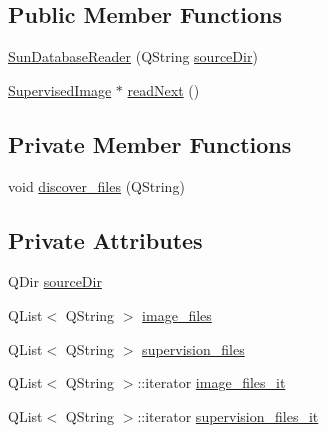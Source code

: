 \subsection*{Public Member Functions}
\begin{DoxyCompactItemize}
\item 
\hyperlink{class_sun_database_reader_a7165e085898b5e329402b8acc17f3e0e}{Sun\+Database\+Reader} (Q\+String \hyperlink{class_sun_database_reader_a6bfc31b2ba24be2b3e18c32e0d343d70}{source\+Dir})
\item 
\hyperlink{class_supervised_image}{Supervised\+Image} $\ast$ \hyperlink{class_sun_database_reader_aadf059f614225be059e05a7c3a75fb26}{read\+Next} ()
\end{DoxyCompactItemize}
\subsection*{Private Member Functions}
\begin{DoxyCompactItemize}
\item 
void \hyperlink{class_sun_database_reader_aefbdf63eaff6755bb3dee0ef8687b3aa}{discover\+\_\+files} (Q\+String)
\end{DoxyCompactItemize}
\subsection*{Private Attributes}
\begin{DoxyCompactItemize}
\item 
Q\+Dir \hyperlink{class_sun_database_reader_a6bfc31b2ba24be2b3e18c32e0d343d70}{source\+Dir}
\item 
Q\+List$<$ Q\+String $>$ \hyperlink{class_sun_database_reader_a155716f43a3dc33e1a4d0a2a4a9f3ff1}{image\+\_\+files}
\item 
Q\+List$<$ Q\+String $>$ \hyperlink{class_sun_database_reader_ac5afd4950a668e5cff2bc5c6ea024b60}{supervision\+\_\+files}
\item 
Q\+List$<$ Q\+String $>$\+::iterator \hyperlink{class_sun_database_reader_a227d88c9c5c3d37b0f27123027c0b00e}{image\+\_\+files\+\_\+it}
\item 
Q\+List$<$ Q\+String $>$\+::iterator \hyperlink{class_sun_database_reader_a78e30a0ac9cfa46c23dbdf8d37226b51}{supervision\+\_\+files\+\_\+it}
\end{DoxyCompactItemize}


